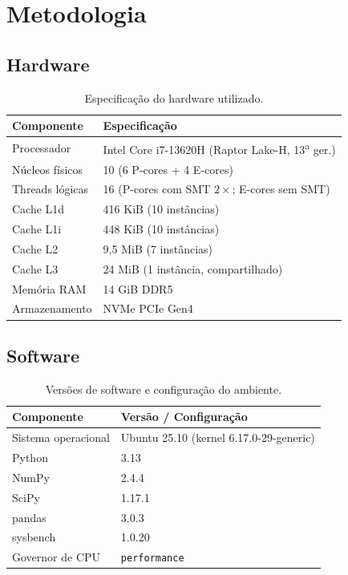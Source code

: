 \documentclass[12pt]{article}
\begin{document}
\section{Metodologia}
\label{sec:metodo}

\subsection{Hardware}

\begin{table}[ht]
\centering
\caption{Especificação do hardware utilizado.}
\label{tab:hw}
\begin{tabular}{ll}
\hline
\textbf{Componente} & \textbf{Especificação} \\
\hline
Processador      & Intel Core i7-13620H (Raptor Lake-H, 13\textsuperscript{a} ger.) \\
Núcleos físicos  & 10 (6 P-cores + 4 E-cores) \\
Threads lógicas  & 16 (P-cores com SMT $2\times$; E-cores sem SMT) \\
Cache L1d        & 416 KiB (10 instâncias) \\
Cache L1i        & 448 KiB (10 instâncias) \\
Cache L2         & 9,5 MiB (7 instâncias) \\
Cache L3         & 24 MiB (1 instância, compartilhado) \\
Memória RAM      & 14 GiB DDR5 \\
Armazenamento    & NVMe PCIe Gen4 \\
\hline
\end{tabular}
\end{table}

\subsection{Software}

\begin{table}[ht]
\centering
\caption{Versões de software e configuração do ambiente.}
\label{tab:sw}
\begin{tabular}{ll}
\hline
\textbf{Componente} & \textbf{Versão / Configuração} \\
\hline
Sistema operacional & Ubuntu 25.10 (kernel 6.17.0-29-generic) \\
Python              & 3.13 \\
NumPy               & 2.4.4 \\
SciPy               & 1.17.1 \\
pandas              & 3.0.3 \\
sysbench            & 1.0.20 \\
Governor de CPU     & \texttt{performance} \\
\hline
\end{tabular}
\end{table}
\end{document}
